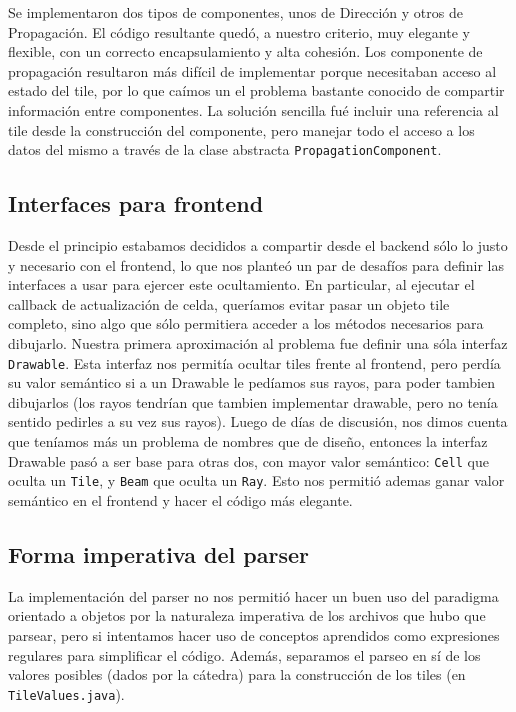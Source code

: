 \documentclass[a4paper, 11pt]{article}
\begin{document}
	Se implementaron dos tipos de componentes, unos de Dirección y otros de Propagación. El código resultante quedó, a nuestro criterio, muy elegante y flexible, con un correcto encapsulamiento y alta cohesión. Los componente de propagación resultaron más difícil de implementar porque necesitaban acceso al estado del tile, por lo que caímos un el problema bastante conocido de compartir información entre componentes. La solución sencilla fué incluir una referencia al tile desde la construcción del componente, pero manejar todo el acceso a los datos del mismo a través de la clase abstracta \texttt{PropagationComponent}.

	\subsection{Interfaces para frontend}
	Desde el principio estabamos decididos a compartir desde el backend sólo lo justo y necesario con el frontend, lo que nos planteó un par de desafíos para definir las interfaces a usar para ejercer este ocultamiento. En particular, al ejecutar el callback de actualización de celda, queríamos evitar pasar un objeto tile completo, sino algo que sólo permitiera acceder a los métodos necesarios para dibujarlo. Nuestra primera aproximación al problema fue definir una sóla interfaz \texttt{Drawable}. Esta interfaz nos permitía ocultar tiles frente al frontend, pero perdía su valor semántico si a un Drawable le pedíamos sus rayos, para poder tambien dibujarlos (los rayos tendrían que tambien implementar drawable, pero no tenía sentido pedirles a su vez sus rayos). Luego de días de discusión, nos dimos cuenta que teníamos más un problema de nombres que de diseño, entonces la interfaz Drawable pasó a ser base para otras dos, con mayor valor semántico: \texttt{Cell} que oculta un \texttt{Tile}, y \texttt{Beam} que oculta un \texttt{Ray}. Esto nos permitió ademas ganar valor semántico en el frontend y hacer el código más elegante.

	\subsection{Forma imperativa del parser}
	La implementación del parser no nos permitió hacer un buen uso del paradigma orientado a objetos por la naturaleza imperativa de los archivos que hubo que parsear, pero si intentamos hacer uso de conceptos aprendidos como expresiones regulares para simplificar el código. Además, separamos el parseo en sí de los valores posibles (dados por la cátedra) para la construcción de los tiles (en \texttt{TileValues.java}).
\end{document}
